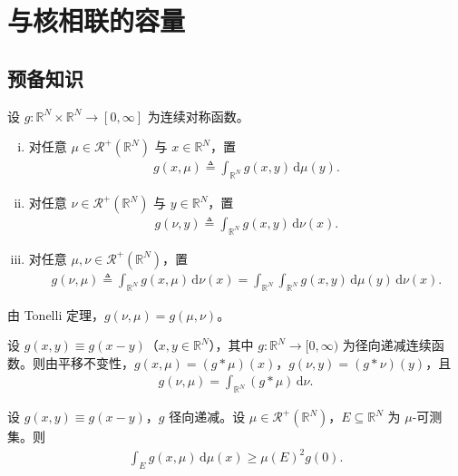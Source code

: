 \documentclass[../../main.tex]{subfiles}%
\begin{document}
\section{与核相联的容量}\label{section:ch03-核容量}

\subsection{预备知识}\label{subsection:ch03-核预备}

设 $g:\mathbb{R}^N\times\mathbb{R}^N\to[0,\infty]$ 为连续对称函数。

\begin{enumerate}[(i)]
\item 对任意 $\mu\in\mathscr{R}^+(\mathbb{R}^N)$ 与 $x\in\mathbb{R}^N$，置
\begin{align}
g(x,\mu)\triangleq \int_{\mathbb{R}^N}g(x,y)\,\mathrm{d}\mu(y).\label{align:ch03-3.21a}
\end{align}
\item 对任意 $\nu\in\mathscr{R}^+(\mathbb{R}^N)$ 与 $y\in\mathbb{R}^N$，置
\begin{align}
g(\nu,y)\triangleq \int_{\mathbb{R}^N}g(x,y)\,\mathrm{d}\nu(x).\label{align:ch03-3.21b}
\end{align}
\item 对任意 $\mu,\nu\in\mathscr{R}^+(\mathbb{R}^N)$，置
\begin{align}
g(\nu,\mu)\triangleq \int_{\mathbb{R}^N}g(x,\mu)\,\mathrm{d}\nu(x)
=\int_{\mathbb{R}^N}\int_{\mathbb{R}^N}g(x,y)\,\mathrm{d}\mu(y)\,\mathrm{d}\nu(x).\label{align:ch03-3.21c}
\end{align}
\end{enumerate}

由 Tonelli 定理，$g(\nu,\mu)=g(\mu,\nu)$。

设 $g(x,y)\equiv g(x-y)$（$x,y\in\mathbb{R}^N$），其中 $g:\mathbb{R}^N\to[0,\infty)$ 为径向递减连续函数。则由平移不变性，$g(x,\mu)=(g*\mu)(x)$，$g(\nu,y)=(g*\nu)(y)$，且
\begin{align}
g(\nu,\mu)=\int_{\mathbb{R}^N}(g*\mu)\,\mathrm{d}\nu.\label{align:ch03-3.22}
\end{align}

\begin{lemma}\label{lemma:ch03-下界估计}
设 $g(x,y)\equiv g(x-y)$，$g$ 径向递减。设 $\mu\in\mathscr{R}^+(\mathbb{R}^N)$，$E\subseteq\mathbb{R}^N$ 为 $\mu$-可测集。则
\begin{align}
\int_E g(x,\mu)\,\mathrm{d}\mu(x)\geqslant\mu(E)^2g(0).\label{align:ch03-3.23}
\end{align}
\end{lemma}
\end{document}
